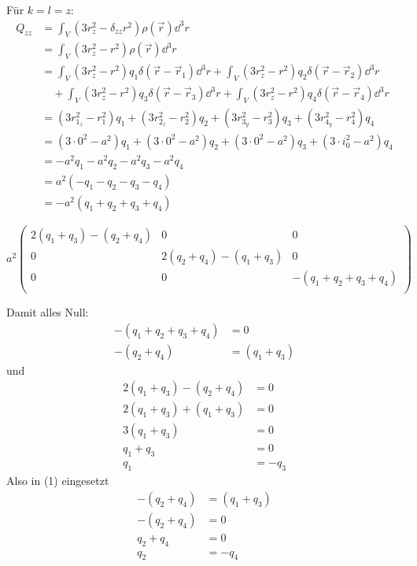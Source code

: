 \documentclass[sectionformat=aufgabe]{gadsescript}
\begin{document}
\begin{enumerate}[label=\alph*)]
		Für $ k = l = z $:
		\begin{align*}
			Q_{zz} &= \int _V (3r_z^2 - \delta_{zz}r^2)\rho(\vec r) \dd ^3 r \\
			&= \int _V (3r_z^2 - r^2)\rho(\vec r) \dd^3 r \\
			&= \int _V (3r_z^2 - r^2) q_1 \delta(\vec r - \vec r_1) \dd^3 r + \int _V (3r_z^2 - r^2) q_2 \delta(\vec r - \vec r_2) \dd^3 r \\
			&\quad + \int _V (3r_z^2 - r^2) q_3 \delta(\vec r - \vec r_3) \dd^3 r + \int _V (3r_z^2 - r^2) q_4 \delta(\vec r - \vec r_4) \dd^3 r \\
			&= (3 r_{1_z} ^2 - r_1^2) q_1 + (3 r_{2_z} ^2 - r_2^2) q_2 + (3 r_{3_y} ^2 - r_3^2) q_3 + (3 r_{4_y} ^2 - r_4^2) q_4  \\
			&= (3 \cdot 0^2 - a^2) q_1 + (3 \cdot 0^2 - a^2) q_2 + (3 \cdot 0 ^2 - a^2) q_3 + (3 \cdot i_0^2 - a^2) q_4  \\
			&= -a^2 q_1 - a^2 q_2 - a^2 q_3 - a^2 q_4  \\
			&= a^2 (- q_1 - q_2 - q_3 - q_4)  \\
			&= -a^2 (q_1 + q_2 + q_3 + q_4) 
		\end{align*}

		\[
			a^2\begin{pmatrix} 
				2 ( q_1 + q_3 ) - (q_2 + q_4) & 0 & 0\\
				0 & 2 ( q_2 + q_4 ) - (q_1 + q_3) & 0\\
				0 & 0 & -(q_1 + q_2 + q_3 + q_4) \\
			\end{pmatrix} 
		\]
		
		Damit alles Null:
		\begin{align*}
			-( q_1 + q_2 + q_3 + q_4 ) &= 0 \\
			-(q_2 + q_4) &= (q_1 + q_3) \tag{1}
		\end{align*}
		und
		\begin{align*}
			2 (q_1 + q_3) - (q_2 + q_4) &= 0 \\
			2 (q_1 + q_3) + (q_1 + q_3) &= 0 \\
			3 (q_1 + q_3) &= 0 \\
			q_1 + q_3 &= 0 \\
			q_1 &= - q_3
		\end{align*}
		Also in (1) eingesetzt
		\begin{align*}
			-(q_2 + q_4) &= (q_1 + q_3) \\
			-(q_2 + q_4) &= 0 \\
			q_2 + q_4 &= 0 \\
			q_2 &= -q_4
		\end{align*}


\end{enumerate}
\end{document}
